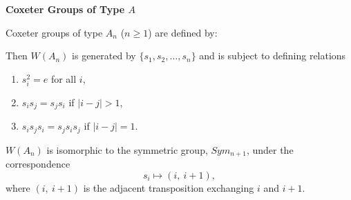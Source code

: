 \documentclass[9pt,handout]{beamer}
\begin{document}
\begin{frame}{\textbf{Coxeter Groups of Type $A$}}

Coxeter groups of type $A_{n}$ ($n\geq 1$) are defined by:
\begin{figure}
\end{figure}

\pause
 
Then $W(A_{n})$ is generated by $\{s_{1}, s_{2}, \ldots, 
s_{n}\}$ and is subject to defining relations
\begin{enumerate}
\item $s_{i}^{2}=e$ for all $i$,
\item $s_{i}s_{j}=s_{j}s_{i}$ if $|i-j|>1$,
\item $s_{i}s_{j}s_{i}=s_{j}s_{i}s_{j}$ if $|i-j|=1$.
\end{enumerate}
\pause 
$W(A_{n})$ is isomorphic to the symmetric group, $Sym_{n+1}$, under 
the correspondence 
\[
s_{i}\mapsto (i,\ i+1),
\]
where $(i,\ i+1)$ is the adjacent transposition exchanging $i$ and $i+1$.

\end{frame}

\end{document}
